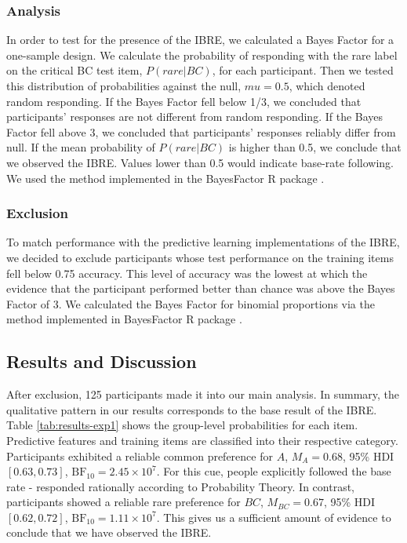 \documentclass[10pt,letterpaper]{article}
\begin{document}
\subsubsection{Analysis}

In order to test for the presence of the IBRE, we calculated a Bayes Factor for a one-sample design.
We calculate the probability of responding with the rare label on the critical BC test item, $P(rare|BC)$, for each participant.
Then we tested this distribution of probabilities against the null, $mu = 0.5$, which denoted random responding.
If the Bayes Factor fell below 1/3, we concluded that participants' responses are not different from random responding.
If the Bayes Factor fell above 3, we concluded that participants' responses reliably differ from null.
If the mean probability of $P(rare|BC)$ is higher than 0.5, we conclude that we observed the IBRE.
Values lower than 0.5 would indicate base-rate following.
We used the method implemented in the BayesFactor R package \cite{morey2022bayes}.
\\

\subsubsection{Exclusion}

To match performance with the predictive learning implementations of the IBRE, we decided to exclude participants whose test performance on the training items fell below 0.75 accuracy.
This level of accuracy was the lowest at which the evidence that the participant performed better than chance was above the Bayes Factor of 3.
We calculated the Bayes Factor for binomial proportions via the method implemented in BayesFactor R package \cite{morey2022bayes}.

\subsection{Results and Discussion}

After exclusion, 125 participants made it into our main analysis.
In summary, the qualitative pattern in our results corresponds to the base result of the IBRE.
Table \ref*{tab:results-exp1} shows the group-level probabilities for each item.
Predictive features and training items are classified into their respective category.
Participants exhibited a reliable common preference for $A$, $M_{A} = 0.68$, 95\% HDI $[0.63, 0.73]$, $\mathrm{BF}_{10} = 2.45 \times 10^{7}$.
For this cue, people explicitly followed the base rate - responded rationally according to Probability Theory.
In contrast, participants showed a reliable rare preference for $BC$, $M_{BC} = 0.67$, 95\% HDI $[0.62, 0.72]$, $\mathrm{BF}_{10} = 1.11 \times 10^{7}$.
This gives us a sufficient amount of evidence to conclude that we have observed the IBRE.
\end{document}
